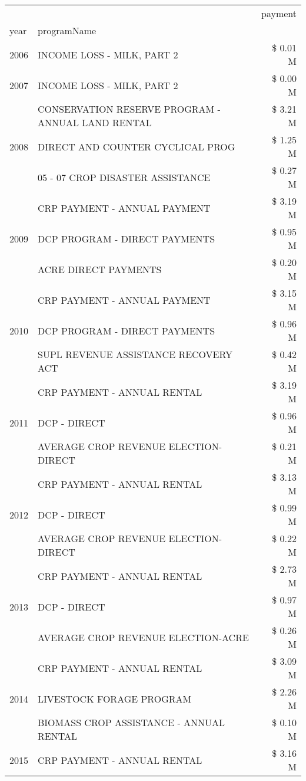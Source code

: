 \begin{tabular}{llr}
\toprule
 &  & payment \\
year & programName &  \\
\midrule
2006 & INCOME LOSS - MILK, PART 2 & \$ 0.01 M \\
\cline{1-3}
2007 & INCOME LOSS - MILK, PART 2 & \$ 0.00 M \\
\cline{1-3}
\multirow[t]{3}{*}{2008} & CONSERVATION RESERVE PROGRAM - ANNUAL LAND RENTAL & \$ 3.21 M \\
 & DIRECT AND COUNTER CYCLICAL PROG & \$ 1.25 M \\
 & 05 - 07 CROP DISASTER ASSISTANCE & \$ 0.27 M \\
\cline{1-3}
\multirow[t]{3}{*}{2009} & CRP PAYMENT - ANNUAL PAYMENT & \$ 3.19 M \\
 & DCP PROGRAM - DIRECT PAYMENTS & \$ 0.95 M \\
 & ACRE DIRECT PAYMENTS & \$ 0.20 M \\
\cline{1-3}
\multirow[t]{3}{*}{2010} & CRP PAYMENT - ANNUAL PAYMENT & \$ 3.15 M \\
 & DCP PROGRAM - DIRECT PAYMENTS & \$ 0.96 M \\
 & SUPL REVENUE ASSISTANCE RECOVERY ACT & \$ 0.42 M \\
\cline{1-3}
\multirow[t]{3}{*}{2011} & CRP PAYMENT - ANNUAL RENTAL & \$ 3.19 M \\
 & DCP - DIRECT & \$ 0.96 M \\
 & AVERAGE CROP REVENUE ELECTION-DIRECT & \$ 0.21 M \\
\cline{1-3}
\multirow[t]{3}{*}{2012} & CRP PAYMENT - ANNUAL RENTAL & \$ 3.13 M \\
 & DCP - DIRECT & \$ 0.99 M \\
 & AVERAGE CROP REVENUE ELECTION-DIRECT & \$ 0.22 M \\
\cline{1-3}
\multirow[t]{3}{*}{2013} & CRP PAYMENT - ANNUAL RENTAL & \$ 2.73 M \\
 & DCP - DIRECT & \$ 0.97 M \\
 & AVERAGE CROP REVENUE ELECTION-ACRE & \$ 0.26 M \\
\cline{1-3}
\multirow[t]{3}{*}{2014} & CRP PAYMENT - ANNUAL RENTAL & \$ 3.09 M \\
 & LIVESTOCK FORAGE PROGRAM & \$ 2.26 M \\
 & BIOMASS CROP ASSISTANCE - ANNUAL RENTAL & \$ 0.10 M \\
\cline{1-3}
\multirow[t]{3}{*}{2015} & CRP PAYMENT - ANNUAL RENTAL & \$ 3.16 M \\

\end{tabular}
